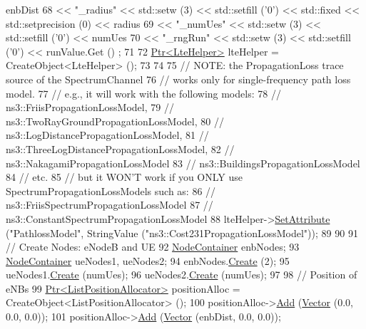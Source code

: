 \begin{DoxyCode}
      enbDist
68        << \textcolor{stringliteral}{"\_radius"}  << std::setw (3) << std::setfill (\textcolor{charliteral}{'0'}) << std::fixed << std::setprecision (0) << 
      radius
69        << \textcolor{stringliteral}{"\_numUes"}  << std::setw (3) << std::setfill (\textcolor{charliteral}{'0'})  << numUes
70        << \textcolor{stringliteral}{"\_rngRun"}  << std::setw (3) << std::setfill (\textcolor{charliteral}{'0'})  << runValue.Get () ;
71 
72   \hyperlink{classns3_1_1Ptr}{Ptr<LteHelper>} lteHelper = CreateObject<LteHelper> ();
73 
74 
75   \textcolor{comment}{// NOTE: the PropagationLoss trace source of the SpectrumChannel}
76   \textcolor{comment}{// works only for single-frequency path loss model.  }
77   \textcolor{comment}{// e.g., it will work with the following models:}
78   \textcolor{comment}{// ns3::FriisPropagationLossModel, }
79   \textcolor{comment}{// ns3::TwoRayGroundPropagationLossModel, }
80   \textcolor{comment}{// ns3::LogDistancePropagationLossModel,}
81   \textcolor{comment}{// ns3::ThreeLogDistancePropagationLossModel, }
82   \textcolor{comment}{// ns3::NakagamiPropagationLossModel}
83   \textcolor{comment}{// ns3::BuildingsPropagationLossModel}
84   \textcolor{comment}{// etc.}
85   \textcolor{comment}{// but it WON'T work if you ONLY use SpectrumPropagationLossModels such as:}
86   \textcolor{comment}{// ns3::FriisSpectrumPropagationLossModel}
87   \textcolor{comment}{// ns3::ConstantSpectrumPropagationLossModel}
88   lteHelper->\hyperlink{classns3_1_1ObjectBase_ac60245d3ea4123bbc9b1d391f1f6592f}{SetAttribute} (\textcolor{stringliteral}{"PathlossModel"}, StringValue (\textcolor{stringliteral}{"ns3::Cost231PropagationLossModel"}));
89   
90 
91   \textcolor{comment}{// Create Nodes: eNodeB and UE}
92   \hyperlink{classns3_1_1NodeContainer}{NodeContainer} enbNodes;
93   \hyperlink{classns3_1_1NodeContainer}{NodeContainer} ueNodes1, ueNodes2;
94   enbNodes.\hyperlink{classns3_1_1NodeContainer_a787f059e2813e8b951cc6914d11dfe69}{Create} (2);
95   ueNodes1.\hyperlink{classns3_1_1NodeContainer_a787f059e2813e8b951cc6914d11dfe69}{Create} (numUes);
96   ueNodes2.\hyperlink{classns3_1_1NodeContainer_a787f059e2813e8b951cc6914d11dfe69}{Create} (numUes);
97 
98   \textcolor{comment}{// Position of eNBs}
99   \hyperlink{classns3_1_1Ptr}{Ptr<ListPositionAllocator>} positionAlloc = CreateObject<ListPositionAllocator> 
      ();
100   positionAlloc->\hyperlink{classns3_1_1ListPositionAllocator_a460e82f015ac012a73ba0ea0cccb3486}{Add} (\hyperlink{classns3_1_1Vector3D_a7e59b47bc94c9cb1dadff68c1d0112d8}{Vector} (0.0, 0.0, 0.0));
101   positionAlloc->\hyperlink{classns3_1_1ListPositionAllocator_a460e82f015ac012a73ba0ea0cccb3486}{Add} (\hyperlink{classns3_1_1Vector3D_a7e59b47bc94c9cb1dadff68c1d0112d8}{Vector} (enbDist, 0.0, 0.0));

\end{DoxyCode}

